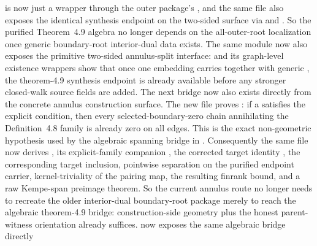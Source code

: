 \documentclass[11pt]{article}
\begin{document}
is now just a wrapper through the outer package's , and the
same file also exposes the identical synthesis endpoint on the two-sided
surface via  and
.
So the purified Theorem~4.9 algebra no longer depends on the all-outer-root
localization once generic boundary-root interior-dual data exists.  The same
module now also exposes the primitive two-sided annulus-split interface:
and its graph-level existence wrappers show that once one embedding carries
 together with generic
, the theorem-4.9 synthesis
endpoint is already available before any stronger closed-walk source fields are
added.
The next bridge now also exists directly from the concrete annulus
construction surface.  The new file
 proves
:
if a  satisfies the explicit
 condition, then every selected-boundary-zero
chain annihilating the Definition~4.8 family is already zero on all edges.
This is the exact non-geometric hypothesis used by the algebraic spanning
bridge in .  Consequently the same file now
derives
,
its explicit-family companion
,
the corrected target identity
,
the corresponding target inclusion, pointwise separation on the purified
endpoint carrier, kernel-triviality of the pairing map, the resulting finrank
bound, and a raw Kempe-span preimage theorem.  So the current annulus route no
longer needs to recreate the older interior-dual boundary-root package merely
to reach the algebraic theorem-4.9 bridge: construction-side geometry plus the
honest parent-witness orientation already suffices.
 now exposes the same algebraic bridge directly
\end{document}
